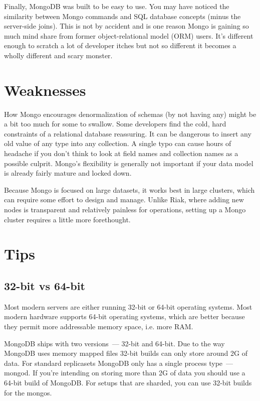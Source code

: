Finally, MongoDB was built to be easy to use. You may have noticed the similarity between Mongo commands and SQL database concepts (minus the server-side joins). This is not by accident and is one reason Mongo is gaining so much mind share from former object-relational model (ORM) users. It’s different enough to scratch a lot of developer itches but not so different it becomes a wholly different and scary monster.\cite{seven_databases}

\section{Weaknesses}

How Mongo encourages denormalization of schemas (by not having any) might be a bit too much for some to swallow. Some developers find the cold, hard constraints of a relational database reassuring. It can be dangerous to insert any old value of any type into any collection. A single typo can cause hours of headache if you don’t think to look at field names and collection names as a possible culprit. Mongo’s flexibility is generally not important if your data model is already fairly mature and locked down.

Because Mongo is focused on large datasets, it works best in large clusters, which can require some effort to design and manage. Unlike Riak, where adding new nodes is transparent and relatively painless for operations, setting up a Mongo cluster requires a little more forethought.\cite{seven_databases}

\section{Tips}

\subsection{32-bit vs 64-bit}

Most modern servers are either running 32-bit or 64-bit operating systems. Most modern hardware supports 64-bit operating systems, which are better because they permit more addressable memory space, i.e. more RAM.

MongoDB ships with two versions~--- 32-bit and 64-bit. Due to the way MongoDB uses memory mapped files 32-bit builds can only store around 2G of data. For standard replicasets MongoDB only has a single process type~--- mongod. If you’re intending on storing more than 2G of data you should use a 64-bit build of MongoDB. For setups that are sharded, you can use 32-bit builds for the mongos.

